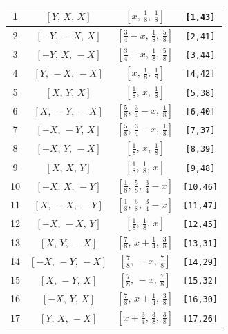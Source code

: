 \documentclass[fleqn,8pt]{jsarticle}
\begin{document}
\begin{longtable}{cccc}
1 & $\left[ Y,\, X,\, X \right]$ & $\left[ x,\, \frac{1}{8},\, \frac{1}{8} \right]$ & {\tt [1,43]} \\ \hline
2 & $\left[ - Y,\, - X,\, X \right]$ & $\left[ \frac{3}{4} - x,\, \frac{1}{8},\, \frac{5}{8} \right]$ & {\tt [2,41]} \\ \hline
3 & $\left[ - Y,\, X,\, - X \right]$ & $\left[ \frac{3}{4} - x,\, \frac{1}{8},\, \frac{5}{8} \right]$ & {\tt [3,44]} \\ \hline
4 & $\left[ Y,\, - X,\, - X \right]$ & $\left[ x,\, \frac{1}{8},\, \frac{1}{8} \right]$ & {\tt [4,42]} \\ \hline
5 & $\left[ X,\, Y,\, X \right]$ & $\left[ \frac{1}{8},\, x,\, \frac{1}{8} \right]$ & {\tt [5,38]} \\ \hline
6 & $\left[ X,\, - Y,\, - X \right]$ & $\left[ \frac{5}{8},\, \frac{3}{4} - x,\, \frac{1}{8} \right]$ & {\tt [6,40]} \\ \hline
7 & $\left[ - X,\, - Y,\, X \right]$ & $\left[ \frac{5}{8},\, \frac{3}{4} - x,\, \frac{1}{8} \right]$ & {\tt [7,37]} \\ \hline
8 & $\left[ - X,\, Y,\, - X \right]$ & $\left[ \frac{1}{8},\, x,\, \frac{1}{8} \right]$ & {\tt [8,39]} \\ \hline
9 & $\left[ X,\, X,\, Y \right]$ & $\left[ \frac{1}{8},\, \frac{1}{8},\, x \right]$ & {\tt [9,48]} \\ \hline
10 & $\left[ - X,\, X,\, - Y \right]$ & $\left[ \frac{1}{8},\, \frac{5}{8},\, \frac{3}{4} - x \right]$ & {\tt [10,46]} \\ \hline
11 & $\left[ X,\, - X,\, - Y \right]$ & $\left[ \frac{1}{8},\, \frac{5}{8},\, \frac{3}{4} - x \right]$ & {\tt [11,47]} \\ \hline
12 & $\left[ - X,\, - X,\, Y \right]$ & $\left[ \frac{1}{8},\, \frac{1}{8},\, x \right]$ & {\tt [12,45]} \\ \hline
13 & $\left[ X,\, Y,\, - X \right]$ & $\left[ \frac{7}{8},\, x + \frac{1}{4},\, \frac{3}{8} \right]$ & {\tt [13,31]} \\ \hline
14 & $\left[ - X,\, - Y,\, - X \right]$ & $\left[ \frac{7}{8},\, - x,\, \frac{7}{8} \right]$ & {\tt [14,29]} \\ \hline
15 & $\left[ X,\, - Y,\, X \right]$ & $\left[ \frac{7}{8},\, - x,\, \frac{7}{8} \right]$ & {\tt [15,32]} \\ \hline
16 & $\left[ - X,\, Y,\, X \right]$ & $\left[ \frac{7}{8},\, x + \frac{1}{4},\, \frac{3}{8} \right]$ & {\tt [16,30]} \\ \hline
17 & $\left[ Y,\, X,\, - X \right]$ & $\left[ x + \frac{3}{4},\, \frac{3}{8},\, \frac{3}{8} \right]$ & {\tt [17,26]} \\ \hline

\end{longtable}
\end{document}
